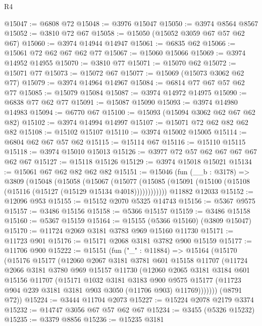\begin{lexlean}{R4}
\begin{coremodule}
@15047 := @6808 @72
@15048 := @3976 @15047
@15050 := @3974 @8564 @8567
@15052 := @3810 @72 @67
@15058 := @15050 (@15052 @3059 @67 @57 @62 @67)
@15060 := @3974 @14944 @14947
@15061 := @6835 @62
@15066 := @15061 @72 @62 @67 @62 @77
@15067 := @15060 @15066
@15069 := @3974 @14952 @14955
@15070 := @3810 @77
@15071 := @15070 @62
@15072 := @15071 @77
@15073 := @15072 @67
@15077 := @15069 (@15073 @3062 @62 @77)
@15079 := @3974 @14964 @14967
@15084 := @6814 @77 @67 @57 @62 @77
@15085 := @15079 @15084
@15087 := @3974 @14972 @14975
@15090 := @6838 @77 @62 @77
@15091 := @15087 @15090
@15093 := @3974 @14980 @14983
@15094 := @6770 @67
@15100 := @15093 (@15094 @3062 @62 @67 @62 @82)
@15102 := @3974 @14994 @14997
@15107 := @15071 @72 @62 @82 @62 @82
@15108 := @15102 @15107
@15110 := @3974 @15002 @15005
@15114 := @6804 @62 @67 @57 @62
@15115 := @15114 @67
@15116 := @15110 @15115
@15118 := @3974 @15010 @15013
@15126 := @3977 @72 @57 @62 @67 @67 @67 @62 @67
@15127 := @15118 @15126
@15129 := @3974 @15018 @15021
@15134 := @15061 @67 @62 @82 @62 @82
@15151 := @15046
    (fun (__b : @3178) =>
    @3809
      (@15048
        (@15058
          (@15067
            (@15077 (@15085 (@15091 (@15100 (@15108 (@15116 (@15127 (@15129 @15134 @4018))))))))))))
    @11882
    @12033
@15152 := @12096 @953
@15155 := @15152 @2070 @5325 @14743
@15156 := @5367 @9575
@15157 := @3486 @15156
@15158 := @5366 @15157
@15159 := @3486 @15158
@15160 := @5367 @15159
@15164 := @15155 (@5366 @15160) (@3809 @15047)
@15170 := @11724 @2069 @3181 @3783 @969 @15160 @11730
@15171 := @11723 @901
@15176 := @15171 @2068 @3181 @3782 @900 @15159
@15177 := @11706 @900
@15222 := @15151
    (fun ("_" : @11884) =>
    @15164
      (@15170
        (@15176
          @15177
          (@12060
            @2067
            @3181
            @3781
            @601
            @15158
            @11707
            (@11724
              @2066
              @3181
              @3780
              @969
              @15157
              @11730
              (@12060
                @2065
                @3181
                @3184
                @601
                @15156
                @11707
                (@15171
                  @1032
                  @3181
                  @3183
                  @900
                  @9575
                  @15177
                  (@11723 @904 @239 @3181 @3181 @903 @3050 (@11706 @903) @11769)))))))
      (@8791 @72))
@15224 := @3444 @11704 @2073
@15227 := @15224 @2078 @2179 @3374
@15232 := @14747 @3056 @67 @57 @62 @67
@15234 := @3455 (@5326 @15232)
@15235 := @3379 @8856
@15236 := @15235 @3181

\end{coremodule}
\end{lexlean}
